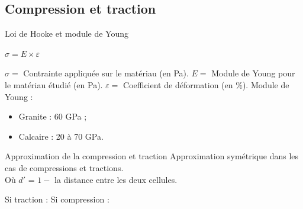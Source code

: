 \documentclass{beamer}
\begin{document}
\subsection{Compression et traction}
\begin{frame}{Loi de Hooke et module de Young}
  \begin{center}
    $\sigma = E \times \varepsilon$
  \end{center}
  $\sigma = $ Contrainte appliquée sur le matériau (en Pa). $E = $ Module de Young pour le matériau étudié (en Pa). $\varepsilon = $ Coefficient de déformation (en $\%$). \smallbreak
  Module de Young :
  \begin{itemize}
    \item Granite : 60 GPa ;
    \item Calcaire : 20 à 70 GPa.
  \end{itemize}
\end{frame}

\begin{frame}{Approximation de la compression et traction}
  Approximation symétrique dans les cas de compressions et tractions. \\
  Où $d'$ = $1 -$ la distance entre les deux cellules. \\
  \begin{center}
    Si traction : \medbreak
     \medbreak
    Si compression : \medbreak
  \end{center}
\end{frame}
\end{document}
